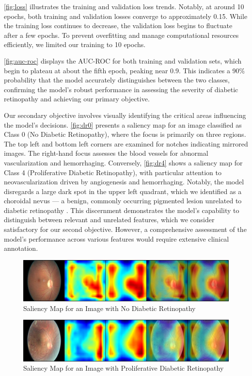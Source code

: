 \autoref{fig:loss} illustrates the training and validation loss trends. Notably, at around 10 epochs, both training and validation losses converge to approximately 0.15. While the training loss continues to decrease, the validation loss begins to fluctuate after a few epochs. To prevent overfitting and manage computational resources efficiently, we limited our training to 10 epochs.

\autoref{fig:auc-roc} displays the AUC-ROC for both training and validation sets, which begin to plateau at about the fifth epoch, peaking near 0.9. This indicates a 90\% probability that the model accurately distinguishes between the two classes, confirming the model's robust performance in assessing the severity of diabetic retinopathy and achieving our primary objective.

Our secondary objective involves visually identifying the critical areas influencing the model's decisions. \autoref{fig:dr0} presents a saliency map for an image classified as Class 0 (No Diabetic Retinopathy), where the focus is primarily on three regions. The top left and bottom left corners are examined for notches indicating mirrored images. The right-hand focus assesses the blood vessels for abnormal vascularization and hemorrhaging. Conversely, \autoref{fig:dr4} shows a saliency map for Class 4 (Proliferative Diabetic Retinopathy), with particular attention to neovascularization driven by angiogenesis and hemorrhaging. Notably, the model disregards a large dark spot in the upper left quadrant, which we identified as a choroidal nevus — a benign, commonly occurring pigmented lesion unrelated to diabetic retinopathy \cite{noauthor_distinguishing_2012}. This discernment demonstrates the model's capability to distinguish between relevant and unrelated features, which we consider satisfactory for our second objective. However, a comprehensive assessment of the model's performance across various features would require extensive clinical annotation.

\begin{figure}[t]
  \centering
  \begin{minipage}{\textwidth}
    \centering
    \includegraphics[scale=0.4]{Images/20_left.jpeg}
    \caption{Saliency Map for an Image with No Diabetic Retinopathy}
    \label{fig:dr0}
  \end{minipage}%
\end{figure}

\begin{figure}[t]
  \centering
  \begin{minipage}{\textwidth}
    \centering
    \includegraphics[scale=0.4]{Images/16_left.jpeg}
    \caption{Saliency Map for an Image with Proliferative Diabetic Retinopathy}
    \label{fig:dr4}
  \end{minipage}%
\end{figure}
